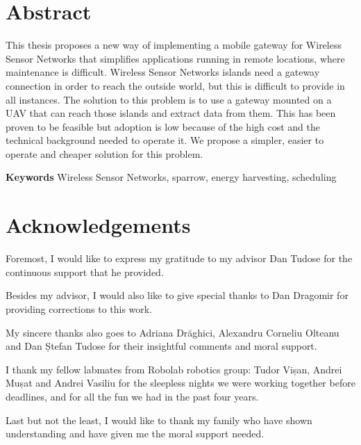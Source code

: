 \chapter*{Abstract}

This thesis proposes a new way of implementing a mobile gateway for Wireless Sensor Networks that simplifies applications running in remote locations, where maintenance is difficult. Wireless Sensor Networks islands need a gateway connection in order to reach the outside world, but this is difficult to provide in all instances.  The solution to this problem is to use a gateway mounted on a UAV that can reach those islands and extract data from them. This has been proven to be feasible but adoption is low because of the high cost and the technical background needed to operate it. We propose a simpler, easier to operate and cheaper solution for this problem.




\textbf{Keywords} Wireless Sensor Networks, sparrow, energy harvesting, scheduling

\chapter*{Acknowledgements}

Foremost, I would like to express my gratitude to my advisor Dan Tudose for the continuous support that he provided.

Besides my advisor, I would also like to give special thanks to Dan Dragomir for providing corrections to this work.

My sincere thanks also goes to Adriana Drăghici, Alexandru Corneliu Olteanu and Dan Ștefan Tudose for their insightful comments  and moral support.

I thank my fellow labmates from Robolab robotics group: Tudor Vișan, Andrei Mușat and Andrei Vasiliu for the sleepless nights we were working together before deadlines, and for all the fun we had in the past four years.

Last but not the least, I would like to thank my family who have shown understanding and have given me the moral support needed.

